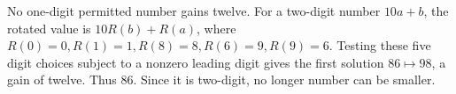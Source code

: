No one-digit permitted number gains twelve. For a two-digit number $10a+b$, the rotated value is $10R(b)+R(a)$, where $R(0)=0,R(1)=1,R(8)=8,R(6)=9,R(9)=6$. Testing these five digit choices subject to a nonzero leading digit gives the first solution $86\mapsto98$, a gain of twelve. Thus $\boxed{86}$. Since it is two-digit, no longer number can be smaller.
